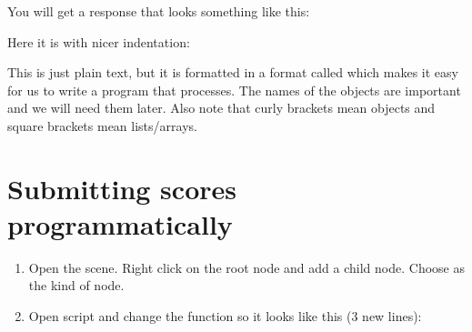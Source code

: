 \documentclass[a4paper,12pt,english]{sphinxmanual}
\begin{document}
\sphinxAtStartPar
You will get a response that looks something like this:

\sphinxAtStartPar
{}

\sphinxAtStartPar
Here it is with nicer indentation:

\begin{sphinxVerbatim}[commandchars=\\\{\}]
      \PYG{p}{[}
      \PYG{p}{]}
\end{sphinxVerbatim}

\sphinxAtStartPar
This is just plain text, but it is formatted in a format called 
which makes it easy for us to write a program that processes. The names
of the objects are important and we will need them later. Also note that
curly brackets mean objects and square brackets mean lists/arrays.


\section{Submitting scores programmatically}
\label{\detokenize{tutorial:submitting-scores-programmatically}}\begin{enumerate}
%
\item {} 
\sphinxAtStartPar
Open the  scene. Right click on the root node and
add a child node. Choose  as the kind of node.

\item {} 
\sphinxAtStartPar
Open  script and change the
 function so it looks like this (3 new
lines):

\end{enumerate}
\end{document}
